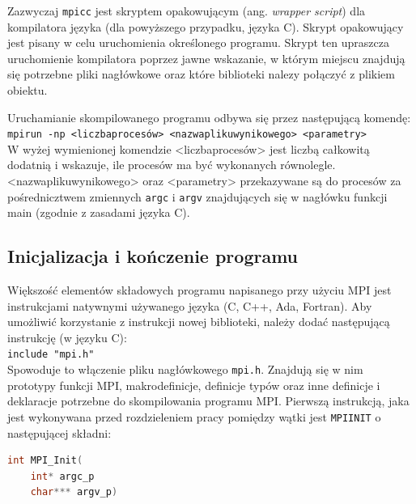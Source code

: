 Zazwyczaj \texttt{mpicc} jest skryptem opakowującym (ang. \textit{wrapper script}) dla kompilatora języka (dla powyższego przypadku, języka C). Skrypt opakowujący jest pisany w celu uruchomienia określonego programu. Skrypt ten upraszcza uruchomienie kompilatora poprzez jawne wskazanie, w którym miejscu znajdują się potrzebne pliki nagłówkowe oraz które biblioteki nalezy połączyć z plikiem obiektu.

Uruchamianie skompilowanego programu odbywa się przez następującą komendę: \\

\texttt{mpirun -np <liczba\textunderscore procesów> <nazwa\textunderscore pliku\textunderscore wynikowego> <parametry>} \\

W wyżej wymienionej komendzie <liczba\textunderscore procesów> jest liczbą całkowitą dodatnią i wskazuje, ile procesów ma być wykonanych równolegle. <nazwa\textunderscore pliku\textunderscore wynikowego> oraz <parametry> przekazywane są do procesów za pośrednicztwem zmiennych \texttt{argc} i \texttt{argv} znajdujących się w nagłówku funkcji main (zgodnie z zasadami języka C).


\subsection{Inicjalizacja i kończenie programu}

Większość elementów składowych programu napisanego przy użyciu MPI jest instrukcjami natywnymi używanego języka (C, C++, Ada, Fortran). Aby umożliwić korzystanie z instrukcji nowej biblioteki, należy dodać następującą instrukcję (w języku C): \\

\texttt{include "mpi.h"} \\

Spowoduje to włączenie pliku nagłówkowego \texttt{mpi.h}. Znajdują się w nim prototypy funkcji MPI, makrodefinicje, definicje typów oraz inne  definicje i deklaracje potrzebne do skompilowania programu MPI. Pierwszą instrukcją, jaka jest wykonywana przed rozdzieleniem pracy pomiędzy wątki jest \texttt{MPI\textunderscore INIT} o następującej składni: \\

\begin{lstlisting}[language=C]
int MPI_Init(
	int* argc_p 
	char*** argv_p)
\end{lstlisting} 

